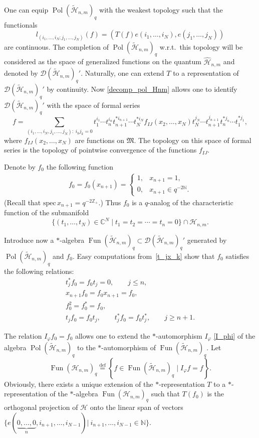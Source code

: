 \documentclass[11pt]{article}
\begin{document}
One can equip $\operatorname{Pol}(\widetilde{\mathscr{H}}_{n,m})_q$ with the weakest topology such that the
functionals
\[
l_{(i_1,\ldots,i_N;j_1,\ldots,j_N)}(f)=(T(f)e(i_1,\ldots,i_N),e(j_1,\ldots,j_N))
\]
are continuous. The completion of $\operatorname{Pol}(\widetilde{\mathscr{H}}_{n,m})_q$ w.r.t.\ this topology
will be considered as the space of generalized functions on the quantum $\widehat{\mathscr{H}}_{n,m}$ and
denoted by $\mathscr{D}(\widetilde{\mathscr{H}}_{n,m})_q'$. Naturally, one can extend $T$ to a representation
of $\mathscr{D}(\widetilde{\mathscr{H}}_{n,m})_q'$ by continuity. Now \eqref{decomp_pol_Hnm} allows one to
identify $\mathscr{D}(\widetilde{\mathscr{H}}_{n,m})_q'$ with the space of formal series
\[
f=\sum_{(i_1,\ldots,i_N,j_1,\ldots,j_N):\;i_kj_k=0} t_1^{i_1}\cdots
t_n^{i_n}t_{n+1}^{*i_{n+1}}\cdots t_N^{*i_N}f_{IJ}(x_2,\ldots,x_N)t_N^{j_N}\cdots
t_{n+1}^{j_{n+1}}t_n^{*j_n}\cdots t_1^{*j_1},
\]
where $f_{IJ}(x_2,\ldots,x_N)$ are functions on $\mathfrak{M}$. The topology on this space of formal series
is the topology of pointwise convergence of the functions $f_{IJ}$.


Denote by $f_0$ the following function
\begin{gather}\label{f_0(x_n+1)}
f_0=f_0(x_{n+1})=
\begin{cases}
1, & x_{n+1}=1,
\\ 0, & x_{n+1}\in q^{-2\mathbb{N}}.
\end{cases}
\end{gather}
(Recall that $\mathrm{spec}\,x_{n+1}=q^{-2\mathbb{Z}_+}$.) Thus $f_0$ is a $q$-analog of the characteristic
function of the submanifold
\[
\big\{ (t_1,\ldots,t_N)\in\mathbb{C}^N\; \big|\;t_1=t_2=\cdots=t_n=0 \big\}\cap\mathscr{H}_{n,m}.
\]

Introduce now a $*$-algebra $\operatorname{Fun}(\widetilde{\mathscr{H}}_{n,m})_q \subset
\mathscr{D}(\widetilde{\mathscr{H}}_{n,m})_q'$ generated by
$\operatorname{Pol}(\widetilde{\mathscr{H}}_{n,m})_q$ and $f_0$. Easy computations from~\eqref{t_jx_k} show
that $f_0$ satisf\/ies the following relations:
\begin{gather*}
 t_j^*f_0=f_0t_j=0,\qquad j\le n,
\\  x_{n+1}f_0=f_0x_{n+1}=f_0,
\\  f_0^2=f_0^*=f_0,
\\  t_jf_0=f_0t_j,\qquad t_j^*f_0=f_0t_j^*,\qquad j\ge n+1.
\end{gather*}

The relation $I_\varphi f_0=f_0$ allows one to extend the $*$-automorphism $I_\varphi$ \eqref{I_phi} of the
algebra $\operatorname{Pol}(\widetilde{\mathscr{H}}_{n,m})_q$ to the $*$-automorphism of
$\operatorname{Fun}(\widetilde{\mathscr{H}}_{n,m})_q$. Let
\[
\operatorname{Fun}(\mathscr{H}_{n,m})_q\overset{\mathrm{def}}{=} \left\{ f\in
\operatorname{Fun}(\widetilde{\mathscr{H}}_{n,m})_q\;\big|\; I_\varphi f=f\right\}.
\]
Obviously, there exists a unique extension of the $*$-representation $T$ to a $*$-representation of the
$*$-algebra $\operatorname{Fun}(\mathscr{H}_{n,m})_q$ such that $T(f_0)$ is the orthogonal projection of
$\mathscr{H}$ onto the linear span of vectors $\{e(\underbrace{0,\ldots,0}_n,i_{n+1},\ldots,i_{N-1})|\:
i_{n+1},\ldots,i_{N-1}\in\mathbb{N}\}$.
\end{document}
